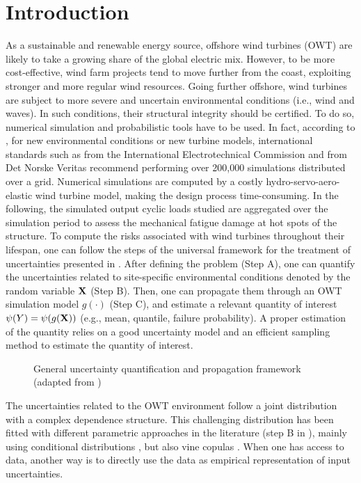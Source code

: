 \section{Introduction}
As a sustainable and renewable energy source, offshore wind turbines (OWT) are likely to take a growing share of the global electric mix. 
However, to be more cost-effective, wind farm projects tend to move further from the coast, exploiting stronger and more regular wind resources. 
Going further offshore, wind turbines are subject to more severe and uncertain environmental conditions (i.e., wind and waves). 
In such conditions, their structural integrity should be certified. To do so, numerical simulation and probabilistic tools have to be used. 
In fact, according to \cite{graf_2016}, for new environmental conditions or new turbine models, international standards such as \cite{iec_2019} from the International Electrotechnical Commission and \cite{dnv_loads_2016} from Det Norske Veritas recommend performing over 200,000 simulations distributed over a grid. 
Numerical simulations are computed by a costly hydro-servo-aero-elastic wind turbine model, making the design process time-consuming. 
In the following, the simulated output cyclic loads studied are aggregated over the simulation period to assess the mechanical fatigue damage at hot spots of the structure. 
To compute the risks associated with wind turbines throughout their lifespan, one can follow the steps of the universal framework for the treatment of uncertainties \citep{rocquigny_2008} presented in . 
After defining the problem (Step A), one can quantify the uncertainties related to site-specific environmental conditions denoted by the random variable ${\bf X}$ (Step B). 
Then, one can propagate them through an OWT simulation model $g(\cdot)$ (Step C), and estimate a relevant quantity of interest $\psi(Y) = \psi(g({\bf X}))$ (e.g., mean, quantile, failure probability). 
A proper estimation of the quantity relies on a good uncertainty model and an efficient sampling method to estimate the quantity of interest.

\begin{figure}[!h]
    \centering
    
    \caption{General uncertainty quantification and propagation framework (adapted from \cite{ajenjo_2023})}
    \label{fig:UQ}
\end{figure}

The uncertainties related to the OWT environment follow a joint distribution with a complex dependence structure. 
This challenging distribution has been fitted with different parametric approaches in the literature (step B in ), mainly using conditional distributions \citep{vanem_fekhari_2023}, but also vine copulas \citep{li_zhan_2020}. 
When one has access to data, another way is to directly use the data as empirical representation of input uncertainties. 

